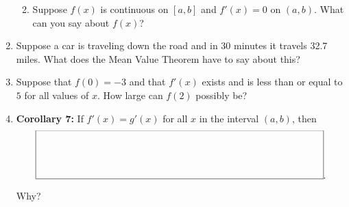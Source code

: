 \documentclass[11pt,fleqn]{article}
\begin{document}
\begin{enumerate}
\begin{enumerate}
	\vfill
	\item Suppose $f(x)$ is continuous on $[a,b]$  and $f'(x)=0$ on $(a,b).$ What can you say about $f(x)$?
	\vfill
	\end{enumerate}
	\newpage
\item Suppose a car is traveling down the road and in 30 minutes it travels
32.7 miles.  What does the Mean Value Theorem have to say about this?
\vfill
\item Suppose that $f(0) = -3$ and that $f'(x)$ exists and is less than or equal to $ 5$ for all
values of $x$. How large can $f(2)$ possibly be? 
\vfill
\item \textbf{Corollary 7:} If $f'(x)=g'(x)$ for all $x$ in the interval $(a,b)$, then 
$$\framebox(300,50){}.$$

Why?
\vspace{1in}

\end{enumerate}
\end{document}
